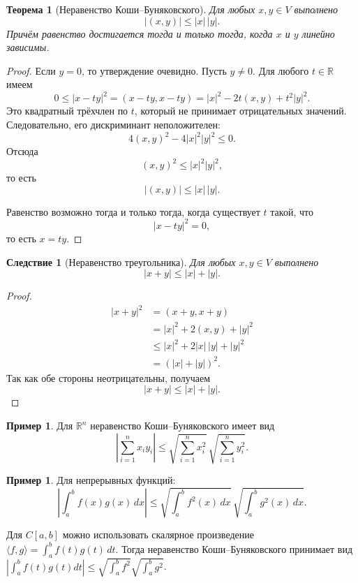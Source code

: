 \documentclass[12pt,a4paper]{article}
\theoremstyle{definition}
\newtheorem{example}[definition]{Пример}
\theoremstyle{plain}
\newtheorem{theorem}[definition]{Теорема}
\newtheorem{corollary}[definition]{Следствие}
\theoremstyle{remark}
\newenvironment{knowledgefix}{\begin{clarifybox}}{\end{clarifybox}}
\newcommand{\R}{\mathbb{R}}
\begin{document}
\begin{theorem}[Неравенство Коши--Буняковского]
Для любых $x,y\in V$ выполнено
\[
    |(x,y)|\le |x|\,|y|.
\]
Причём равенство достигается тогда и только тогда, когда $x$ и $y$ линейно зависимы.
\end{theorem}

\begin{proof}
Если $y=0$, то утверждение очевидно. Пусть $y\ne0$.
Для любого $t\in\R$ имеем
\[
    0\le |x-ty|^2=(x-ty,x-ty)
    =|x|^2-2t(x,y)+t^2|y|^2.
\]
Это квадратный трёхчлен по $t$, который не принимает отрицательных значений. Следовательно, его дискриминант неположителен:
\[
    4(x,y)^2-4|x|^2|y|^2\le0.
\]
Отсюда
\[
    (x,y)^2\le |x|^2|y|^2,
\]
то есть
\[
    |(x,y)|\le |x|\,|y|.
\]

Равенство возможно тогда и только тогда, когда существует $t$ такой, что
\[
    |x-ty|^2=0,
\]
то есть $x=ty$.
\end{proof}

\begin{corollary}[Неравенство треугольника]
Для любых $x,y\in V$ выполнено
\[
    |x+y|\le |x|+|y|.
\]
\end{corollary}

\begin{proof}
\[
\begin{aligned}
    |x+y|^2
    &=(x+y,x+y)\\
    &=|x|^2+2(x,y)+|y|^2\\
    &\le |x|^2+2|x|\,|y|+|y|^2\\
    &=(|x|+|y|)^2.
\end{aligned}
\]
Так как обе стороны неотрицательны, получаем
\[
    |x+y|\le |x|+|y|.
\]
\end{proof}

\begin{example}
Для $\R^n$ неравенство Коши--Буняковского имеет вид
\[
    \left|\sum_{i=1}^n x_i y_i\right|
    \le
    \sqrt{\sum_{i=1}^n x_i^2}\,
    \sqrt{\sum_{i=1}^n y_i^2}.
\]
\end{example}

\begin{example}
Для непрерывных функций:
\[
    \left|\int_a^b f(x)g(x)\,dx\right|
    \le
    \sqrt{\int_a^b f^2(x)\,dx}\,
    \sqrt{\int_a^b g^2(x)\,dx}.
\]
\begin{knowledgefix}
Для \(C[a,b]\) можно использовать скалярное произведение \(\langle f,g\rangle=\int_a^b f(t)g(t)\,dt\). Тогда неравенство Коши--Буняковского принимает вид \(|\int_a^b f(t)g(t)dt|\le \sqrt{\int_a^b f^2}\sqrt{\int_a^b g^2}\).
\end{knowledgefix}
\end{example}
\end{document}

